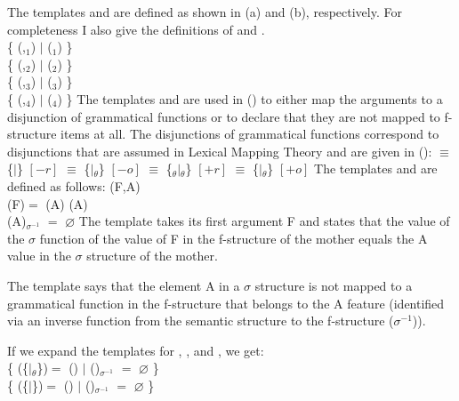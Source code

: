 The templates  and  are defined as shown in (a) and
(b), respectively. For completeness I also give the definitions of  and .
\eal
\ex {} \tempeq\\
      \{ (,$_1$) $\mid$
      ($_1$) \}
\ex {} \tempeq\\
      \{ (,$_2$) $\mid$
      ($_2$) \}
\ex {} \tempeq\\
      \{ (,$_3$) $\mid$
      ($_3$) \}
\ex {} \tempeq\\
      \{ (,$_4$) $\mid$
      ($_4$) \}
\zl
The templates  and  are used in () to either map the arguments to a
disjunction of grammatical functions or to declare that they are not mapped to f-structure items at
all. The disjunctions of grammatical functions correspond to disjunctions that are assumed in
Lexical Mapping Theory and are given in ():
\eal
\ex {} $\equiv$
      \{$\mid$\}
      \hfill $[-r]$
\ex {} $\equiv$
      \{$\mid$$_\theta$\}
      \hfill $[-o]$
\ex {} $\equiv$
      \{$_\theta$$\mid$$_\theta$\}
      \hfill $[+r]$
\ex {} $\equiv$ 
      \{$\mid$$_\theta$\}
      \hfill $[+o]$
\zl
The templates  and  are defined as follows:
\eal
\ex {}(F,A) \tempeq\\  (\up F)\sig $=$  (\upsig A) 
\ex {}(A) \tempeq\\  (\upsig A)$_{{\sigma}^{-1}}$ $=$ $\varnothing$  
\zl
The template  takes its first argument F and states that the value of the $\sigma$
function of the value of F in the f-structure of the mother equals the A value in the $\sigma$ structure
of the mother.

The template  says that the element A in a $\sigma$ structure is not mapped to a
grammatical function in the f-structure that belongs to the A feature (identified via an inverse
function from the semantic structure to the f-structure ($\sigma^{-1}$)). 

If we expand the templates for , , and , we get:
\eal
\label{ex-arg1-arg2-arg3}
\ex {} \tempeq\\
      \{ (\up \{$\mid$$_\theta$\})\sig $=$  (\upsig {})  $\mid$
      (\upsig {})$_{{\sigma}^{-1}}$ $=$ $\varnothing$ \}
\ex {} \tempeq\\
      \{ (\up \{$\mid$\})\sig $=$  (\upsig {})  $\mid$
      (\upsig {})$_{{\sigma}^{-1}}$ $=$ $\varnothing$ \}

